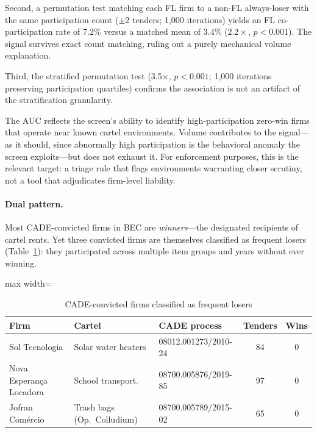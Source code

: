 Second, a permutation test matching each FL firm to a non-FL
always-loser with the same participation count ($\pm 2$ tenders;
1,000 iterations) yields an FL co-participation rate of 7.2\%
versus a matched mean of 3.4\% ($2.2\times$, $p < 0.001$). The
signal survives exact count matching, ruling out a purely
mechanical volume explanation.

Third, the stratified permutation test (3.5$\times$, $p < 0.001$;
1,000 iterations preserving participation quartiles) confirms the
association is not an artifact of the stratification granularity.

The AUC reflects the screen's ability to identify
high-participation zero-win firms that operate near known cartel
environments. Volume contributes to the signal---as it
should, since abnormally high participation is the behavioral
anomaly the screen exploits---but does not exhaust it.
For enforcement purposes, this is the relevant target:
a triage rule that flags environments warranting closer scrutiny,
not a tool that adjudicates firm-level liability.

\paragraph{Dual pattern.}
Most CADE-convicted firms in BEC are \emph{winners}---the designated
recipients of cartel rents. Yet three convicted firms are themselves
classified as frequent losers (Table~\ref{tab:cade_fl_firms}):
they participated across multiple item groups and years without
ever winning.

\begin{table}[htbp]
\centering
\caption{CADE-convicted firms classified as frequent losers}
\label{tab:cade_fl_firms}
\begin{adjustbox}{max width=\textwidth}
\footnotesize
\begin{tabular}{lllcc}
\toprule
Firm & Cartel & CADE process & Tenders & Wins \\
\midrule
Sol Tecnologia & Solar water heaters & 08012.001273/2010-24 & 84 & 0 \\
Nova Esperan\c{c}a Locadora & School transport.\ & 08700.005876/2019-85 & 97 & 0 \\
Jofran Com\'ercio & Trash bags (Op.\ Colludium) & 08700.005789/2015-02 & 65 & 0 \\
\bottomrule
\end{tabular}
\end{adjustbox}
\end{table}

